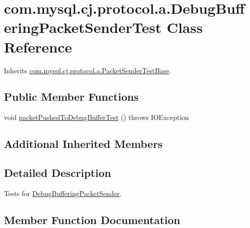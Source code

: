 \hypertarget{classcom_1_1mysql_1_1cj_1_1protocol_1_1a_1_1_debug_buffering_packet_sender_test}{}\section{com.\+mysql.\+cj.\+protocol.\+a.\+Debug\+Buffering\+Packet\+Sender\+Test Class Reference}
\label{classcom_1_1mysql_1_1cj_1_1protocol_1_1a_1_1_debug_buffering_packet_sender_test}


Inherits \mbox{\hyperlink{classcom_1_1mysql_1_1cj_1_1protocol_1_1a_1_1_packet_sender_test_base}{com.\+mysql.\+cj.\+protocol.\+a.\+Packet\+Sender\+Test\+Base}}.

\subsection*{Public Member Functions}
\begin{DoxyCompactItemize}
\item 
void \mbox{\hyperlink{classcom_1_1mysql_1_1cj_1_1protocol_1_1a_1_1_debug_buffering_packet_sender_test_a805325b46dfbe27627ffaea1cd93cdc5}{packet\+Pushed\+To\+Debug\+Buffer\+Test}} ()  throws I\+O\+Exception 
\end{DoxyCompactItemize}
\subsection*{Additional Inherited Members}


\subsection{Detailed Description}
Tests for \mbox{\hyperlink{classcom_1_1mysql_1_1cj_1_1protocol_1_1a_1_1_debug_buffering_packet_sender}{Debug\+Buffering\+Packet\+Sender}}. 

\subsection{Member Function Documentation}
\mbox{\label{classcom_1_1mysql_1_1cj_1_1protocol_1_1a_1_1_debug_buffering_packet_sender_test_a805325b46dfbe27627ffaea1cd93cdc5}} 
